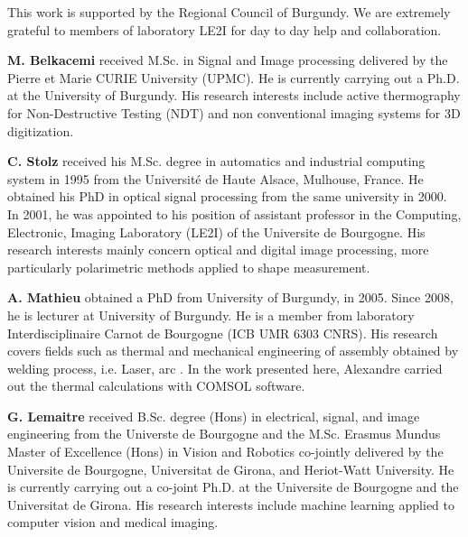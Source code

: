 \documentclass[12pt]{spieman}
\begin{document}
\begin{spacing}{2}
% 

\acknowledgments     %

This work is supported by the Regional Council of Burgundy. We are extremely grateful to members of laboratory LE2I for day to day help and collaboration.


\newpage


\newpage

\vspace{2ex}\noindent\textbf{M. Belkacemi} received M.Sc. in Signal and Image processing delivered by the Pierre et Marie CURIE University (UPMC). 
He is currently carrying out a Ph.D. at the University of Burgundy. His research interests include active thermography for Non-Destructive Testing (NDT) and non conventional imaging systems for 3D digitization.

\vspace{2ex}\noindent\textbf{C. Stolz} received his M.Sc. degree in automatics and industrial computing system in 1995 from the Université de Haute Alsace, Mulhouse, France. He obtained his PhD in optical signal processing from the same university in 2000. In 2001, he was appointed to his position of assistant professor in the Computing, Electronic, Imaging Laboratory (LE2I) of the Universite de Bourgogne. His research interests mainly concern optical and digital image processing, more particularly polarimetric methods applied to shape measurement.

\vspace{2ex}\noindent\textbf{A. Mathieu} obtained a PhD from University of Burgundy, in 2005. Since 2008, he is lecturer at University of Burgundy. He is a member from laboratory Interdisciplinaire Carnot de Bourgogne (ICB UMR 6303 CNRS). His research covers fields such as thermal and mechanical engineering of assembly obtained by welding process, i.e. Laser, arc . In the work presented here, Alexandre carried out the thermal calculations with COMSOL software. 

\vspace{2ex}\noindent\textbf{G. Lemaitre} received B.Sc. degree (Hons) in electrical, signal, and image engineering from the Universte de Bourgogne and the M.Sc. Erasmus Mundus Master of Excellence (Hons) in Vision and Robotics co-jointly delivered by the Universite de Bourgogne, Universitat de Girona, and Heriot-Watt University. 
He is currently carrying out a co-joint Ph.D. at the Universite de Bourgogne and the Universitat de Girona. His research interests include machine learning applied to computer vision and medical imaging.


\end{spacing}
\end{document}
